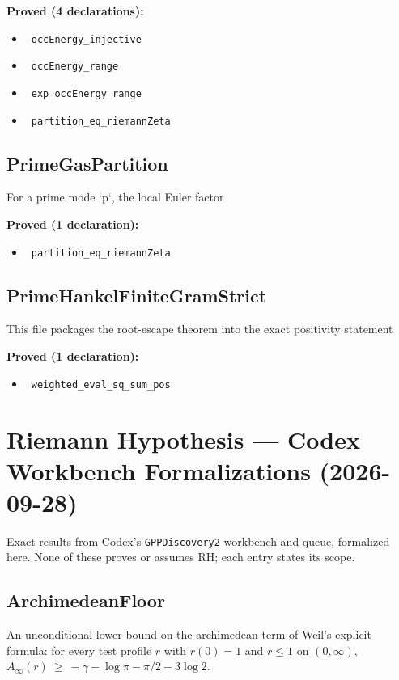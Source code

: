 \documentclass{report}
\theoremstyle{definition}
\begin{document}
\noindent\textbf{Proved (4 declarations):}
\begin{itemize}
  \item {}\leanok\ \texttt{occEnergy\_injective}
  \item {}\leanok\ \texttt{occEnergy\_range}
  \item {}\leanok\ \texttt{exp\_occEnergy\_range}
  \item {}\leanok\ \texttt{partition\_eq\_riemannZeta}
\end{itemize}

\subsection{PrimeGasPartition}
For a prime mode `p`, the local Euler factor

\noindent\textbf{Proved (1 declaration):}
\begin{itemize}
  \item {}\leanok\ \texttt{partition\_eq\_riemannZeta}
\end{itemize}

\subsection{PrimeHankelFiniteGramStrict}
This file packages the root-escape theorem into the exact positivity statement

\noindent\textbf{Proved (1 declaration):}
\begin{itemize}
  \item {}\leanok\ \texttt{weighted\_eval\_sq\_sum\_pos}
\end{itemize}

\section{Riemann Hypothesis --- Codex Workbench Formalizations (2026-09-28)}
Exact results from Codex's \texttt{GPPDiscovery2} workbench and queue, formalized here. None of these proves or assumes RH; each entry states its scope.

\subsection{ArchimedeanFloor}
An unconditional lower bound on the archimedean term of Weil's explicit formula: for every test profile $r$ with $r(0)=1$ and $r\le 1$ on $(0,\infty)$, $A_\infty(r)\ \ge\ -\gamma-\log\pi-\pi/2-3\log 2$.
\end{document}
